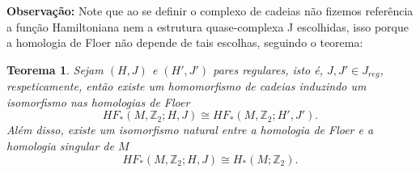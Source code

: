 \documentclass[12pt]{book}
\newtheorem{teorema}{Teorema}[section]
\newcommand{\inteiros}{\mathbb{Z}}
\begin{document}
	\textbf{Observação:} Note que ao se definir o complexo de cadeias não fizemos referência a função Hamiltoniana nem a estrutura quase-complexa J escolhidas, isso porque a homologia de Floer não depende de tais escolhas, seguindo o teorema:
	
	\begin{teorema}
		Sejam $(H,J)$ e $(H',J')$ pares regulares, isto é, $J, J' \in J_{reg}$, respeticamente, então existe um homomorfismo de cadeias induzindo um isomorfismo nas homologias de Floer
		$$
		HF_{*}(M,\inteiros_{2};H,J) \cong HF_{*}(M,\inteiros_{2};H',J'). 
		$$
		Além disso, existe um isomorfismo natural entre a homologia de Floer e a homologia singular de $M$
		$$
		HF_{*}(M,\inteiros_{2};H,J) \cong H_{*}(M;\inteiros_{2}). 
		$$
		
	\end{teorema}
	
\end{document}
